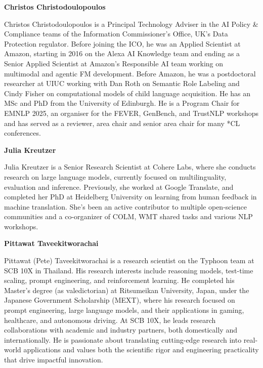 

\textbf{Christos Christodoulopoulos}

Christos Christodoulopoulos is a Principal Technology Adviser in the AI Policy \& Compliance teams of the Information Commissioner's Office, UK’s Data Protection regulator. Before joining the ICO, he was an Applied Scientist at Amazon, starting in 2016 on the Alexa AI Knowledge team and ending as a Senior Applied Scientist at Amazon's Responsible AI team working on multimodal and agentic FM development. Before Amazon, he was a postdoctoral researcher at UIUC working with Dan Roth on Semantic Role Labeling and Cindy Fisher on computational models of child language acquisition. He has an MSc and PhD from the University of Edinburgh. He is a Program Chair for EMNLP 2025, an organiser for the FEVER, GenBench, and TrustNLP workshops and has served as a reviewer, area chair and senior area chair for many *CL conferences.

\vspace{\baselineskip}

\textbf{Julia Kreutzer}

Julia Kreutzer is a Senior Research Scientist at Cohere Labs, where she conducts research on large language models, currently focused on multilinguality, evaluation and inference. Previously, she worked at Google Translate, and completed her PhD at Heidelberg University on learning from human feedback in machine translation. She's been an active contributor to multiple open-science communities and a co-organizer of COLM, WMT shared tasks and various NLP workshops.

\vspace{\baselineskip}

\textbf{Pittawat Taveekitworachai}

Pittawat (Pete) Taveekitworachai is a research scientist on the Typhoon team at SCB 10X in Thailand. His research interests include reasoning models, test-time scaling, prompt engineering, and reinforcement learning. He completed his Master’s degree (as valedictorian) at Ritsumeikan University, Japan, under the Japanese Government Scholarship (MEXT), where his research focused on prompt engineering, large language models, and their applications in gaming, healthcare, and autonomous driving. At SCB 10X, he leads research collaborations with academic and industry partners, both domestically and internationally. He is passionate about translating cutting-edge research into real-world applications and values both the scientific rigor and engineering practicality that drive impactful innovation.

